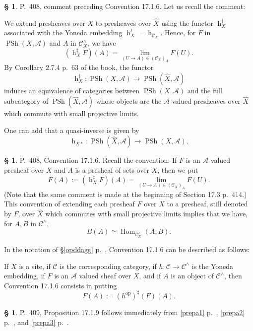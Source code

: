 \documentclass[12pt]{article}
\theoremstyle{remark}
\theoremstyle{definition}
\newtheorem{s}[thm]{\S}
\newcommand{\oo}{\operatorname}
\newcommand{\A}{\mathcal A}
\newcommand{\C}{\mathcal C}
\DeclareMathOperator{\Hom}{Hom}
\DeclareMathOperator{\op}{op}
\begin{document}
%

\begin{s}\label{s408}
P.~408, comment preceding Convention 17.1.6. Let us recall the comment: 

We extend presheaves over $X$ to presheaves over $\widehat X$ using the functor $\oo h_X^\ddagger$ associated with the Yoneda embedding $\oo h_X^t=\oo h_{\C_X}$. Hence, for $F$ in $\oo{PSh}(X,\A)$ and $A$ in $\C_X^\wedge$, we have 
$$
(\oo h_X^\ddagger F)(A)=\lim_{(U\to A)\in(\C_X)_A}F(U).
$$ 
By Corollary 2.7.4 p.~63 of the book, the functor 
$$
\oo h_X^\ddagger:\oo{PSh}(X,\A)\to\oo{PSh}(\widehat X,\A)
$$ 
induces an equivalence of categories between $\oo{PSh}(X,\A)$ and the full subcategory of $\oo{PSh}(\widehat X,\A)$ whose objects are the $\A$-valued presheaves over $\widehat X$ which commute with small projective limits. 

One can add that a quasi-inverse is given by 
$$
\oo h_{X*}:\oo{PSh}(\widehat X,\A)\to\oo{PSh}(X,\A). 
$$ 
\end{s}

%

\begin{s}
P.~408, Convention 17.1.6. Recall the convention: If $F$ is an $\A$-valued presheaf over $X$ and $A$ is a presheaf of sets over $X$, then we put 
%
\begin{equation}\label{408}
F(A):=(\oo h_X^\ddagger F)(A)=\lim_{(U\to A)\in(\C_X)_A}F(U).
\end{equation}
% 
(Note that the same comment is made at the beginning of Section 17.3 p.~414.) This convention of extending each presheaf $F$ over $X$ to a presheaf, still denoted by $F$, over $\widehat X$ which commutes with small projective limits implies that we have, for $A,B$ in $\C^\wedge$, 
$$
B(A)\simeq\Hom_{\C_X^\wedge}(A,B).
$$ 

In the notation of \S\ref{opddagg} p.~\pageref{opddagg}, Convention 17.1.6 can be described as follows:

If $X$ is a site, if $\C$ is the corresponding category, if $h:\C\to\C^\wedge$ is the Yoneda embedding, if $F$ is an $\A$ valued sheaf over $X$, and if $A$ is an object of $\C^\wedge$, then Convention 17.1.6 consists in putting 
$$
F(A):=(h^{\op})^\ddagger(F)(A).
$$ 
\end{s}

%

\begin{s}\label{prepa5}
P.~409, Proposition 17.1.9 follows immediately from \eqref{prepa1} p.~\pageref{prepa1}, \eqref{prepa2} p.~\pageref{prepa2}, and \eqref{prepa3} p.~\pageref{prepa3}.
\end{s}
\end{document}
